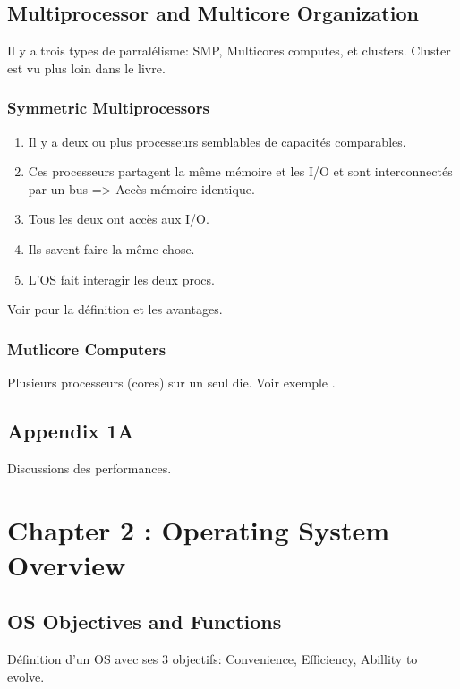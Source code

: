\subsection{Multiprocessor and Multicore Organization}
\label{sec:smp}
Il y a trois types de parralélisme: SMP, Multicores computes, et clusters.
Cluster est vu plus loin dans le livre.

\subsubsection{Symmetric Multiprocessors}
\begin{enumerate}
	\item Il y a deux ou plus processeurs semblables de capacités comparables.
	\item Ces processeurs partagent la même mémoire et les I/O et sont interconnectés par un bus => Accès mémoire identique.
	\item Tous les deux ont accès aux I/O.
	\item Ils savent faire la même chose.
	\item L'OS fait interagir les deux procs.
\end{enumerate}
Voir \cite[p.~53-54]{stallings} pour la définition et les avantages.

\subsubsection{Mutlicore Computers}
Plusieurs processeurs (cores) sur un seul die.
Voir exemple \cite[p.~56]{stallings}.

\subsection{Appendix 1A}
Discussions des performances.

\newpage


\section{Chapter 2 : Operating System Overview}

\subsection{OS Objectives and Functions}
Définition d'un OS avec ses 3 objectifs: Convenience, Efficiency, Abillity to evolve.

